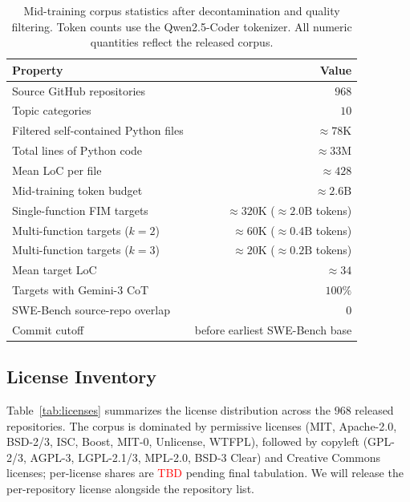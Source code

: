 \begin{table}[h]
\centering
\caption{Mid-training corpus statistics after decontamination and
quality filtering. Token counts use the Qwen2.5-Coder tokenizer.
All numeric quantities reflect the released corpus.}
\label{tab:dataset}
\small
\setlength{\tabcolsep}{6pt}
\begin{tabular}{lr}
\toprule
Property & Value \\
\midrule
Source GitHub repositories                       & $968$ \\
Topic categories                                 & $10$ \\
Filtered self-contained Python files             & $\approx 78\mathrm{K}$ \\
Total lines of Python code                       & $\approx 33\mathrm{M}$ \\
Mean LoC per file                                & $\approx 428$ \\
Mid-training token budget                        & $\approx 2.6\mathrm{B}$ \\
\midrule
Single-function FIM targets                      & $\approx 320\mathrm{K}$ ($\approx 2.0\mathrm{B}$ tokens) \\
Multi-function targets ($k{=}2$)                 & $\approx 60\mathrm{K}$ ($\approx 0.4\mathrm{B}$ tokens) \\
Multi-function targets ($k{=}3$)                 & $\approx 20\mathrm{K}$ ($\approx 0.2\mathrm{B}$ tokens) \\
Mean target LoC                                  & $\approx 34$ \\
Targets with Gemini-3 CoT                        & $100\%$ \\
\midrule
SWE-Bench source-repo overlap                    & $0$ \\
Commit cutoff                                    & before earliest SWE-Bench base \\
\bottomrule
\end{tabular}
\end{table}

\subsection{License Inventory}
\label{app:data:license}

Table~\ref{tab:licenses} summarizes the license distribution across the
$968$ released repositories. The corpus is dominated by permissive
licenses (MIT, Apache-2.0, BSD-2/3, ISC, Boost, MIT-0, Unlicense, WTFPL),
followed by copyleft (GPL-2/3, AGPL-3, LGPL-2.1/3, MPL-2.0, BSD-3 Clear)
and Creative Commons licenses; per-license shares are
\textcolor{red}{TBD} pending final tabulation. We will release the
per-repository license alongside the repository list.

